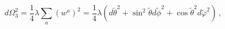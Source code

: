 \begin{equation}
\label{metric3}
d\Omega_3^2 = \frac{1}{4}\lambda \sum_a
\left(w^a\right)^2=\frac{1}{4} \lambda \left( d\tilde{\theta}^2
+\sin^2\tilde{\theta} d\tilde{\phi}^2 +\cos\tilde{\theta}^2
d\tilde{\varphi}^2\right)\,,
\end{equation}

